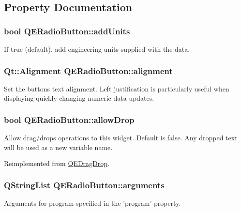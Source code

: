 \subsection{Property Documentation}
\hypertarget{classQERadioButton_a41dbe1bbe357e6b5b9b791c74e9a6512}{
\subsubsection[{addUnits}]{\setlength{\rightskip}{0pt plus 5cm}bool QERadioButton::addUnits}}
\label{classQERadioButton_a41dbe1bbe357e6b5b9b791c74e9a6512}
If true (default), add engineering units supplied with the data. \hypertarget{classQERadioButton_a9386513fc2ec438935a5a11587e48814}{
\subsubsection[{alignment}]{\setlength{\rightskip}{0pt plus 5cm}Qt::Alignment QERadioButton::alignment}}
\label{classQERadioButton_a9386513fc2ec438935a5a11587e48814}
Set the buttons text alignment. Left justification is particularly useful when displaying quickly changing numeric data updates. \hypertarget{classQERadioButton_a929608c74dad400185efa15f02b72bd9}{
\subsubsection[{allowDrop}]{\setlength{\rightskip}{0pt plus 5cm}bool QERadioButton::allowDrop}}
\label{classQERadioButton_a929608c74dad400185efa15f02b72bd9}
Allow drag/drops operations to this widget. Default is false. Any dropped text will be used as a new variable name. 

Reimplemented from \hyperlink{classQEDragDrop}{QEDragDrop}.

\hypertarget{classQERadioButton_aa3b16b50a571d339ca359ba54fd4afa8}{
\subsubsection[{arguments}]{\setlength{\rightskip}{0pt plus 5cm}QStringList QERadioButton::arguments}}
\label{classQERadioButton_aa3b16b50a571d339ca359ba54fd4afa8}
Arguments for program specified in the 'program' property. 


